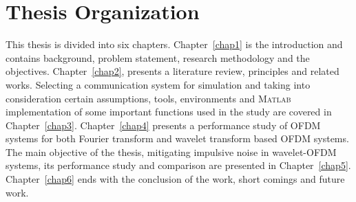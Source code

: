 	\section{Thesis Organization}
		This thesis is divided into six chapters. Chapter~\ref{chap1} is the introduction and contains background, problem statement, research methodology and the objectives. Chapter~\ref{chap2}, presents a literature review, principles and related works. Selecting a communication system for simulation and taking into consideration certain assumptions, tools, environments and  \textsc{Matlab} implementation of some important functions used in the study   are covered  in Chapter~\ref{chap3}. Chapter~\ref{chap4} presents a performance study of OFDM systems for both Fourier transform and wavelet transform based OFDM systems. The main objective of the thesis, mitigating impulsive noise in wavelet-OFDM systems, its performance study and comparison are presented in Chapter~\ref{chap5}. Chapter~\ref{chap6} ends with the conclusion of the work, short comings and future work.